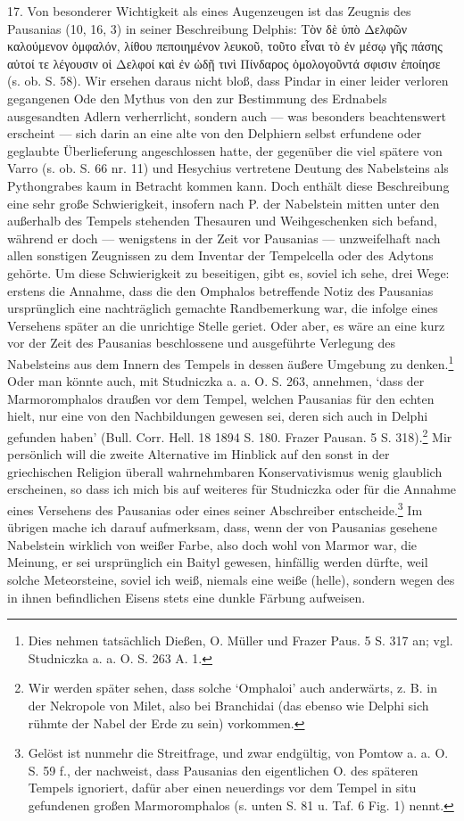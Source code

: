 \documentclass[a4paper, 11pt, oneside]{article}
\begin{document}
17. Von besonderer Wichtigkeit als eines Augenzeugen ist das Zeugnis des Pausanias (10, 16, 3) in seiner Beschreibung Delphis: Τὸν δὲ ὑπὸ Δελφῶν καλούμενον ὀμφαλόν, λίθου πεποιημένον λευκοῦ, τοῦτο εἶναι τὸ ἐν μέσῳ γῆς πάσης αὐτοί τε λέγουσιν οἱ Δελφοί καὶ ἐν ὠδῇ τινὶ Πίνδαρος ὁμολογοῦντά σφισιν ἐποίησε (s. ob. S. 58). Wir ersehen daraus nicht bloß, dass Pindar in einer leider verloren gegangenen Ode den Mythus von den zur Bestimmung des Erdnabels ausgesandten Adlern verherrlicht, sondern auch --- was besonders beachtenswert erscheint --- sich darin an eine alte von den Delphiern selbst erfundene oder geglaubte Überlieferung angeschlossen hatte, der gegenüber die viel spätere von Varro (s. ob. S. 66 nr. 11) und Hesychius vertretene Deutung des Nabelsteins als Pythongrabes kaum in Betracht kommen kann. Doch enthält diese Beschreibung eine sehr große Schwierigkeit, insofern nach P. der Nabelstein mitten unter den außerhalb des Tempels stehenden Thesauren und Weihgeschenken sich befand, während er doch --- wenigstens in der Zeit vor Pausanias --- unzweifelhaft nach allen sonstigen Zeugnissen zu dem Inventar der Tempelcella oder des Adytons gehörte. Um diese Schwierigkeit zu beseitigen, gibt es, soviel ich sehe, drei Wege: erstens die Annahme, dass die den Omphalos betreffende Notiz des Pausanias ursprünglich eine nachträglich gemachte Randbemerkung war, die infolge eines Versehens später an die unrichtige Stelle geriet. Oder aber, es wäre an eine kurz vor der Zeit des Pausanias beschlossene und ausgeführte Verlegung des Nabelsteins aus dem Innern des Tempels in dessen äußere Umgebung zu denken.\footnote{Dies nehmen tatsächlich Dießen, O. Müller und Frazer Paus. 5 S. 317 an; vgl. Studniczka a. a. O. S. 263 A. 1.} Oder man könnte auch, mit Studniczka a. a. O. S. 263, annehmen, `dass der Marmoromphalos draußen vor dem Tempel, welchen Pausanias für den echten hielt, nur eine von den Nachbildungen gewesen sei, deren sich auch in Delphi gefunden haben' (Bull. Corr. Hell. 18 1894 S. 180. Frazer Pausan. 5 S. 318).\footnote{Wir werden später sehen, dass solche `Omphaloi' auch anderwärts, z. B. in der Nekropole von Milet, also bei Branchidai (das ebenso wie Delphi sich rühmte der Nabel der Erde zu sein) vorkommen.} Mir persönlich will die zweite Alternative im Hinblick auf den sonst in der griechischen Religion überall wahrnehmbaren Konservativismus wenig glaublich erscheinen, so dass ich mich bis auf weiteres für Studniczka oder für die Annahme eines Versehens des Pausanias oder eines seiner Abschreiber entscheide.\footnote{Gelöst ist nunmehr die Streitfrage, und zwar endgültig, von Pomtow a. a. O. S. 59 f., der nachweist, dass Pausanias den eigentlichen O. des späteren Tempels ignoriert, dafür aber einen neuerdings vor dem Tempel in situ gefundenen großen Marmoromphalos (s. unten S. 81 u. Taf. 6 Fig. 1) nennt.} Im übrigen mache ich darauf aufmerksam, dass, wenn der von Pausanias gesehene Nabelstein wirklich von weißer Farbe, also doch wohl von Marmor war, die Meinung, er sei ursprünglich ein Baityl gewesen, hinfällig werden dürfte, weil solche Meteorsteine, soviel ich weiß, niemals eine weiße (helle), sondern wegen des in ihnen befindlichen Eisens stets eine dunkle Färbung aufweisen.
\end{document}
